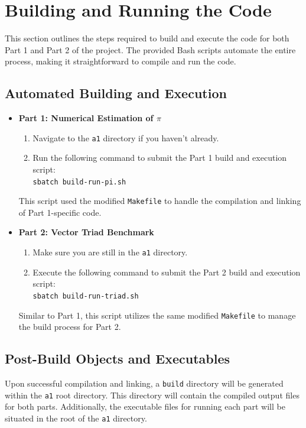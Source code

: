 \documentclass{article}
\begin{document}
\section{Building and Running the Code}

This section outlines the steps required to build and execute the code for both Part 1 and Part 2 of the project. The provided Bash scripts automate the entire process, making it straightforward to compile and run the code.

\subsection{Automated Building and Execution}
\begin{itemize}
    \item \textbf{Part 1: Numerical Estimation of \(\pi\)} 
    \begin{enumerate}
        \item Navigate to the \texttt{a1} directory if you haven't already.
        \item Run the following command to submit the Part 1 build and execution script: \\
        \texttt{sbatch build-run-pi.sh}
    \end{enumerate}
    This script used the modified \texttt{Makefile} to handle the compilation and linking of Part 1-specific code.
    
    \item \textbf{Part 2: Vector Triad Benchmark}
    \begin{enumerate}
        \item Make sure you are still in the \texttt{a1} directory.
        \item Execute the following command to submit the Part 2 build and execution script: \\
        \texttt{sbatch build-run-triad.sh}
    \end{enumerate}
    Similar to Part 1, this script utilizes the same modified \texttt{Makefile} to manage the build process for Part 2.
\end{itemize}

\subsection{Post-Build Objects and Executables}
Upon successful compilation and linking, a \texttt{build} directory will be generated within the \texttt{a1} root directory. This directory will contain the compiled output files for both parts. Additionally, the executable files for running each part will be situated in the root of the \texttt{a1} directory.
\end{document}
